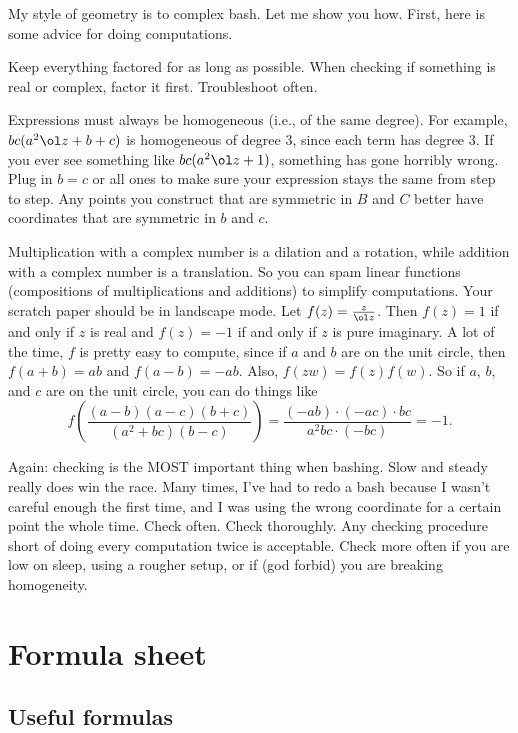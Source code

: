 \documentclass[11pt]{scrartcl}
\begin{document}
My style of geometry is to complex bash. Let me show you how. First, here is some advice for doing computations.
\begin{itemize}
	\ii Keep everything factored for as long as possible. When checking if something is real or complex, factor it first.
	\ii Troubleshoot often.
	\begin{itemize}
		\ii Expressions must always be homogeneous (i.e., of the same degree). For example, $bc(a^2\ol z + b + c)$ is homogeneous of degree $3$, since each term has degree $3$. If you ever see something like $bc(a^2\ol z + 1)$, something has gone horribly wrong.
		\ii Plug in $b = c$ or all ones to make sure your expression stays the same from step to step.
		\ii Any points you construct that are symmetric in $B$ and $C$ better have coordinates that are symmetric in $b$ and $c$.
	\end{itemize}
	\ii Multiplication with a complex number is a dilation and a rotation, while addition with a complex number is a translation. So you can spam linear functions (compositions of multiplications and additions) to simplify computations.
	\ii Your scratch paper should be in landscape mode.
	\ii Let $f(z) = \frac z{\ol z}$. Then $f(z) = 1$ if and only if $z$ is real and $f(z) = -1$ if and only if $z$ is pure imaginary. A lot of the time, $f$ is pretty easy to compute, since if $a$ and $b$ are on the unit circle, then $f(a + b) = ab$ and $f(a - b) = -ab$. Also, $f(zw) = f(z)f(w)$. So if $a$, $b$, and $c$ are on the unit circle, you can do things like
	\[f\left( \frac{(a - b)(a - c)(b + c)}{(a^2 + bc)(b - c)} \right) = \frac{(-ab) \cdot (-ac) \cdot bc}{a^2bc \cdot (-bc)} = -1.\]
\end{itemize}

Again: checking is the MOST important thing when bashing. Slow and steady really does win the race. Many times, I've had to redo a bash because I wasn't careful enough the first time, and I was using the wrong coordinate for a certain point the whole time. Check often. Check thoroughly. Any checking procedure short of doing every computation twice is acceptable. Check more often if you are low on sleep, using a rougher setup, or if (god forbid) you are breaking homogeneity.

\pagebreak

\section{Formula sheet}

\subsection{Useful formulas}
\end{document}
